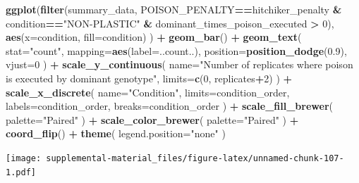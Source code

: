 \documentclass[]{book}
\newenvironment{Shaded}{\begin{snugshade}}{\end{snugshade}}
\newcommand{\DataTypeTok}[1]{\textcolor[rgb]{0.13,0.29,0.53}{#1}}
\newcommand{\DecValTok}[1]{\textcolor[rgb]{0.00,0.00,0.81}{#1}}
\newcommand{\FloatTok}[1]{\textcolor[rgb]{0.00,0.00,0.81}{#1}}
\newcommand{\KeywordTok}[1]{\textcolor[rgb]{0.13,0.29,0.53}{\textbf{#1}}}
\newcommand{\NormalTok}[1]{#1}
\newcommand{\OperatorTok}[1]{\textcolor[rgb]{0.81,0.36,0.00}{\textbf{#1}}}
\newcommand{\StringTok}[1]{\textcolor[rgb]{0.31,0.60,0.02}{#1}}
\begin{document}
\begin{Shaded}
\begin{Highlighting}[]
\KeywordTok{ggplot}\NormalTok{(}\KeywordTok{filter}\NormalTok{(summary_data, POISON_PENALTY}\OperatorTok{==}\NormalTok{hitchiker_penalty }\OperatorTok{&}\StringTok{ }\NormalTok{condition}\OperatorTok{==}\StringTok{"NON-PLASTIC"} \OperatorTok{&}\StringTok{ }\NormalTok{dominant_times_poison_executed }\OperatorTok{>}\StringTok{ }\DecValTok{0}\NormalTok{), }\KeywordTok{aes}\NormalTok{(}\DataTypeTok{x=}\NormalTok{condition, }\DataTypeTok{fill=}\NormalTok{condition) ) }\OperatorTok{+}
\StringTok{  }\KeywordTok{geom_bar}\NormalTok{() }\OperatorTok{+}
\StringTok{  }\KeywordTok{geom_text}\NormalTok{(}
    \DataTypeTok{stat=}\StringTok{"count"}\NormalTok{,}
    \DataTypeTok{mapping=}\KeywordTok{aes}\NormalTok{(}\DataTypeTok{label=}\NormalTok{..count..),}
    \DataTypeTok{position=}\KeywordTok{position_dodge}\NormalTok{(}\FloatTok{0.9}\NormalTok{),}
    \DataTypeTok{vjust=}\DecValTok{0}
\NormalTok{  ) }\OperatorTok{+}
\StringTok{  }\KeywordTok{scale_y_continuous}\NormalTok{(}
    \DataTypeTok{name=}\StringTok{"Number of replicates where poison is executed by dominant genotype"}\NormalTok{,}
    \DataTypeTok{limits=}\KeywordTok{c}\NormalTok{(}\DecValTok{0}\NormalTok{, replicates}\OperatorTok{+}\DecValTok{2}\NormalTok{)}
\NormalTok{  ) }\OperatorTok{+}
\StringTok{  }\KeywordTok{scale_x_discrete}\NormalTok{(}
    \DataTypeTok{name=}\StringTok{"Condition"}\NormalTok{,}
    \DataTypeTok{limits=}\NormalTok{condition_order,}
    \DataTypeTok{labels=}\NormalTok{condition_order,}
    \DataTypeTok{breaks=}\NormalTok{condition_order}
\NormalTok{  ) }\OperatorTok{+}
\StringTok{  }\KeywordTok{scale_fill_brewer}\NormalTok{(}
    \DataTypeTok{palette=}\StringTok{"Paired"}
\NormalTok{  ) }\OperatorTok{+}
\StringTok{  }\KeywordTok{scale_color_brewer}\NormalTok{(}
    \DataTypeTok{palette=}\StringTok{"Paired"}
\NormalTok{  ) }\OperatorTok{+}
\StringTok{  }\KeywordTok{coord_flip}\NormalTok{() }\OperatorTok{+}
\StringTok{  }\KeywordTok{theme}\NormalTok{(}
    \DataTypeTok{legend.position=}\StringTok{"none"}
\NormalTok{  )}
\end{Highlighting}
\end{Shaded}

\texttt{[image: supplemental-material\_files/figure-latex/unnamed-chunk-107-1.pdf]}
\end{document}
